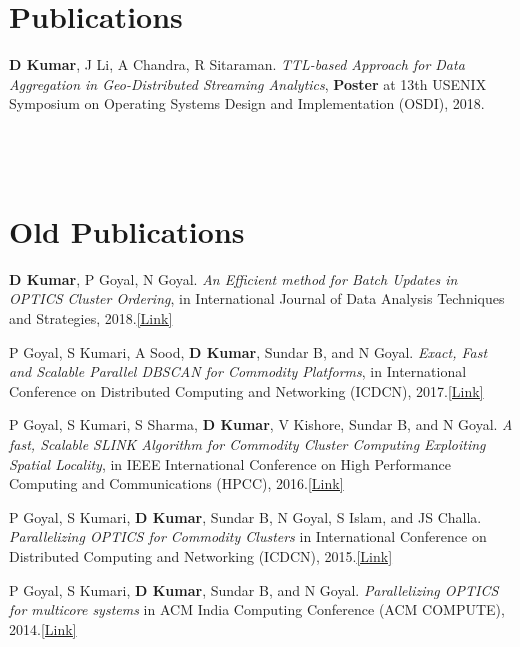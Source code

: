 \documentclass[margin,line]{res}
\begin{document}
\begin{resume}
\section{\sc Publications}
\textbf{D Kumar}, J Li, A Chandra, R Sitaraman. {\it TTL-based Approach for Data Aggregation in Geo-Distributed Streaming Analytics}, \textbf{Poster} at 13th USENIX Symposium on Operating Systems Design and Implementation (OSDI), 2018.
\\
\\
\\
\\

\section{ \sc Old    \space Publications\protect\footnotemark{}}
\protect{}

{\bf D Kumar}, P Goyal, N Goyal. {\it An Efficient method for Batch Updates in OPTICS Cluster Ordering}, in International Journal of Data Analysis Techniques and
Strategies, 2018.\href{https://www.inderscienceonline.com/doi/pdf/10.1504/IJDATS.2018.090631}{\color{blue}[Link]}

P Goyal, S Kumari, A Sood, {\bf  D Kumar}, Sundar B, and N Goyal. {\it Exact, Fast and Scalable Parallel DBSCAN for Commodity Platforms}, in International Conference on Distributed Computing and Networking
(ICDCN), 2017.\href{https://dl.acm.org/citation.cfm?id=3007773}{\color{blue}[Link]}

P Goyal, S Kumari, S Sharma, {\bf D Kumar}, V Kishore, Sundar
B, and N Goyal. {\it A fast, Scalable SLINK Algorithm for Commodity
	Cluster Computing Exploiting Spatial Locality}, in IEEE International Conference on High Performance Computing and Communications (HPCC), 2016.\href{http://ieeexplore.ieee.org/document/7828388/}{\color{blue}[Link]}

P Goyal, S Kumari, {\bf D Kumar}, Sundar B, N Goyal, S Islam, and JS Challa. {\it Parallelizing OPTICS for Commodity Clusters} in International Conference on Distributed Computing and Networking (ICDCN), 2015.\href{http://dl.acm.org/citation.cfm?id=2684477}{\color{blue}[Link]}

P Goyal, S Kumari, {\bf D Kumar}, Sundar B, and N Goyal.
{\it Parallelizing OPTICS for multicore systems} in ACM India Computing
Conference (ACM COMPUTE), 2014.\href{http://dl.acm.org/citation.cfm?id=2675763}{\color{blue}[Link]}


\end{resume}
\end{document}
